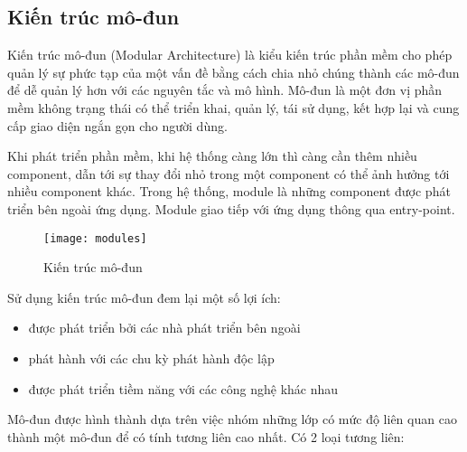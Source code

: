 \subsection{Kiến trúc mô-đun}

Kiến trúc mô-đun (Modular Architecture) là kiểu kiến trúc phần mềm cho phép quản lý sự phức tạp của một vấn đề bằng cách chia nhỏ chúng thành các mô-đun để dễ quản lý hơn với các nguyên tắc và mô hình. Mô-đun là một đơn vị phần mềm không trạng thái có thể triển khai, quản lý, tái sử dụng, kết hợp lại và cung cấp giao diện ngắn gọn cho người dùng.

Khi phát triển phần mềm, khi hệ thống càng lớn thì càng cần thêm nhiều component, dẫn tới sự thay đổi nhỏ trong một component có thể ảnh hưởng tới nhiều component khác. Trong hệ thống, module là những component được phát triển bên ngoài ứng dụng. Module giao tiếp với ứng dụng thông qua entry-point.

\begin{figure}[ht]
	\centering
	\texttt{[image: modules]}
	\caption{Kiến trúc mô-đun}
\end{figure}

Sử dụng kiến trúc mô-đun đem lại một số lợi ích:

\begin{itemize}
	\begin{itemize}
		\item được phát triển bởi các nhà phát triển bên ngoài
		\item phát hành với các chu kỳ phát hành độc lập
		\item được phát triển tiềm năng với các công nghệ khác nhau
	\end{itemize}
\end{itemize}

Mô-đun được hình thành dựa trên việc nhóm những lớp có mức độ liên quan cao thành một mô-đun để có tính tương liên cao nhất. Có 2 loại tương liên:

